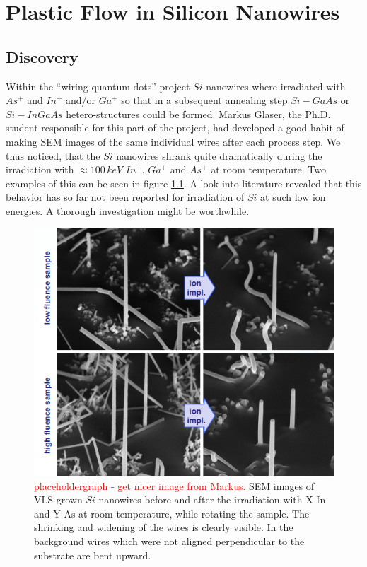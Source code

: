 \chapter{Plastic Flow in Silicon Nanowires}

\section{Discovery}

Within the ``wiring quantum dots'' project $Si$ nanowires where irradiated with $As^+$ and $In^+$ and/or $Ga^+$ so that in a subsequent annealing step $Si-GaAs$ or $Si-InGaAs$ hetero-structures could be formed. Markus Glaser, the Ph.D. student responsible for this part of the project, had developed a good habit of making SEM images of the same individual wires after each process step. We thus noticed, that the $Si$ nanowires shrank quite dramatically during the irradiation with $\approx 100\,keV$ $In^+$, $Ga^+$ and $As^+$ at room temperature. Two examples of this can be seen in figure \ref{deformSEM}. A look into literature revealed that this behavior has so far not been reported for irradiation of $Si$ at such low ion energies. A thorough investigation might be worthwhile. 
 
\begin{figure}
	\centering
		\includegraphics[width=.48\textwidth]{images/deformSEM.png}
	\caption{\textcolor{red}{placeholdergraph - get nicer image from Markus.} SEM images of VLS-grown $Si$-nanowires before and after the irradiation with X In and Y As at room temperature, while rotating the sample. The shrinking and widening of the wires is clearly visible. In the background wires which were not aligned perpendicular to the substrate are bent upward.} 
	\label{deformSEM}
\end{figure}

